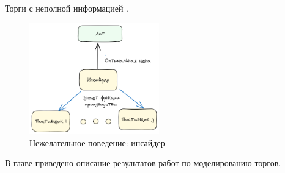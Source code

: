 Торги с неполной информацией \cite{milgrom1982value}.


\begin{figure}[h]
    \centering
    \includegraphics[width=0.5\textwidth]{assets/settings/insider.excalidraw.png}
    \caption{Нежелательное поведение: инсайдер }
\end{figure}



В главе приведено описание результатов работ по моделированию торгов.